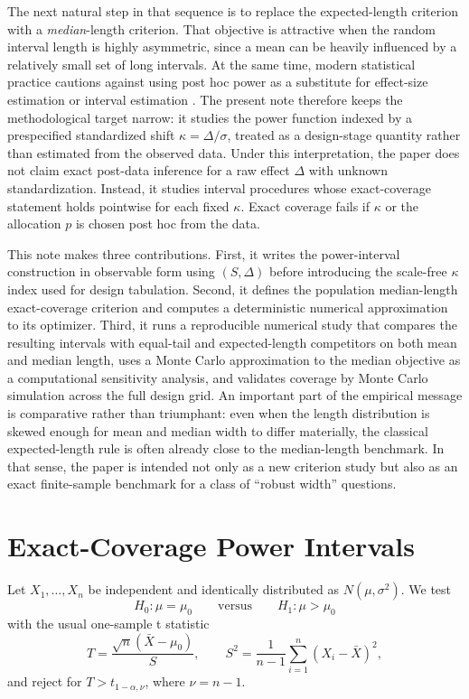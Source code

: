 \documentclass[11pt]{article}
\begin{document}
The next natural step in that sequence is to replace the expected-length criterion with a \emph{median}-length criterion. That objective is attractive when the random interval length is highly asymmetric, since a mean can be heavily influenced by a relatively small set of long intervals. At the same time, modern statistical practice cautions against using post hoc power as a substitute for effect-size estimation or interval estimation \citep{hoenig2001abuse,greenland2016misinterpretations}. The present note therefore keeps the methodological target narrow: it studies the power function indexed by a prespecified standardized shift $\kappa=\Delta/\sigma$, treated as a design-stage quantity rather than estimated from the observed data. Under this interpretation, the paper does not claim exact post-data inference for a raw effect $\Delta$ with unknown standardization. Instead, it studies interval procedures whose exact-coverage statement holds pointwise for each fixed $\kappa$. Exact coverage fails if $\kappa$ or the allocation $p$ is chosen post hoc from the data.

This note makes three contributions. First, it writes the power-interval construction in observable form using $(S,\Delta)$ before introducing the scale-free $\kappa$ index used for design tabulation. Second, it defines the population median-length exact-coverage criterion and computes a deterministic numerical approximation to its optimizer. Third, it runs a reproducible numerical study that compares the resulting intervals with equal-tail and expected-length competitors on both mean and median length, uses a Monte Carlo approximation to the median objective as a computational sensitivity analysis, and validates coverage by Monte Carlo simulation across the full design grid. An important part of the empirical message is comparative rather than triumphant: even when the length distribution is skewed enough for mean and median width to differ materially, the classical expected-length rule is often already close to the median-length benchmark. In that sense, the paper is intended not only as a new criterion study but also as an exact finite-sample benchmark for a class of ``robust width'' questions.

\section{Exact-Coverage Power Intervals}
Let $X_1,\dots,X_n$ be independent and identically distributed as $N(\mu,\sigma^2)$. We test
\[
H_0:\mu=\mu_0 \qquad \text{versus} \qquad H_1:\mu>\mu_0
\]
with the usual one-sample t statistic
\[
T = \frac{\sqrt{n}(\bar X-\mu_0)}{S},
\qquad
S^2=\frac{1}{n-1}\sum_{i=1}^{n}(X_i-\bar X)^2,
\]
and reject for $T>t_{1-\alpha,\nu}$, where $\nu=n-1$.
\end{document}
